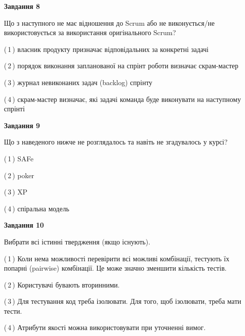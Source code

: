 \documentclass[10pt, ukrainian]{article}
\begin{document}
{\begin {large}
{\begin {center}\textbf{Завдання 8}\end {center}}\par
Що з наступного не має відношення до Scrum або не виконується/не використовується за використання оригінального Scrum?\par
\vspace{2mm}



(\,1\,) власник продукту призначає відповідальних за конкретні задачі%



(\,2\,) порядок виконання запланованої на спрінт роботи визначає скрам-мастер%



(\,3\,) журнал невиконаних задач (backlog) спрінту%



(\,4\,) скрам-мастер визначає, які задачі команда буде виконувати на наступному спрінті%


{\begin {center}\textbf{Завдання 9}\end {center}}\par
Що з наведеного нижче не розглядалось та навіть не згадувалось у курсі?\par
\vspace{2mm}



(\,1\,) SAFe%



(\,2\,) poker%



(\,3\,) XP%



(\,4\,) спіральна модель%


{\begin {center}\textbf{Завдання 10}\end {center}}\par
Вибрати всі істинні твердження (якщо існують).\par
\vspace{2mm}



(\,1\,) Коли нема можливості перевірити всі можливі комбінації, тестують їх попарні (pairwise) комбінації. Це може значно зменшити кількість тестів.%



(\,2\,) Користувачі бувають вторинними.%



(\,3\,) Для тестування код треба ізолювати. Для того, щоб ізолювати, треба мати тести.%



(\,4\,) Атрибути якості можна використовувати при уточненні вимог.%



\end {large}}
\end{document}
